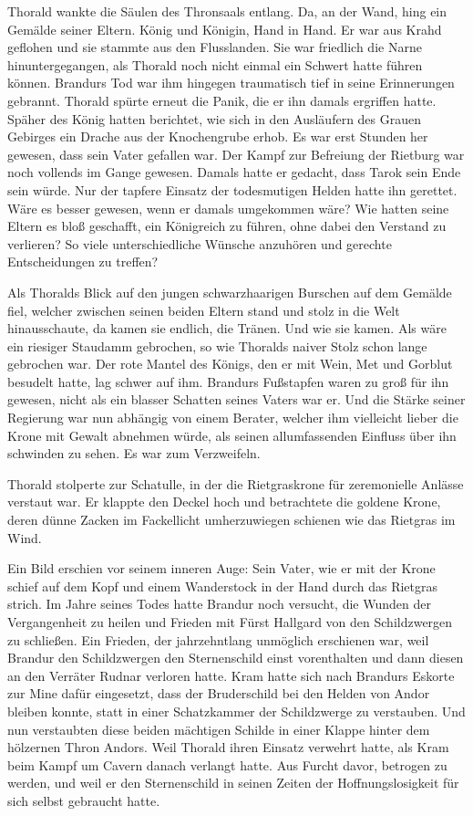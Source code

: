 Thorald wankte die Säulen des Thronsaals entlang. Da, an der Wand, hing ein Gemälde seiner Eltern. König und Königin, Hand in Hand. Er war aus Krahd geflohen und sie stammte aus den Flusslanden. Sie war friedlich die Narne hinuntergegangen, als Thorald noch nicht einmal ein Schwert hatte führen können. Brandurs Tod war ihm hingegen traumatisch tief in seine Erinnerungen gebrannt. Thorald spürte erneut die Panik, die er ihn damals ergriffen hatte. Späher des König hatten berichtet, wie sich in den Ausläufern des Grauen Gebirges ein Drache aus der Knochengrube erhob. Es war erst Stunden her gewesen, dass sein Vater gefallen war. Der Kampf zur Befreiung der Rietburg war noch vollends im Gange gewesen. Damals hatte er gedacht, dass Tarok sein Ende sein würde. Nur der tapfere Einsatz der todesmutigen Helden hatte ihn gerettet. Wäre es besser gewesen, wenn er damals umgekommen wäre? Wie hatten seine Eltern es bloß geschafft, ein Königreich zu führen, ohne dabei den Verstand zu verlieren? So viele unterschiedliche Wünsche anzuhören und gerechte Entscheidungen zu treffen?

Als Thoralds Blick auf den jungen schwarzhaarigen Burschen auf dem Gemälde fiel, welcher zwischen seinen beiden Eltern stand und stolz in die Welt hinausschaute, da kamen sie endlich, die Tränen. Und wie sie kamen. Als wäre ein riesiger Staudamm gebrochen, so wie Thoralds naiver Stolz schon lange gebrochen war. Der rote Mantel des Königs, den er mit Wein, Met und Gorblut besudelt hatte, lag schwer auf ihm. Brandurs Fußstapfen waren zu groß für ihn gewesen, nicht als ein blasser Schatten seines Vaters war er. Und die Stärke seiner Regierung war nun abhängig von einem Berater, welcher ihm vielleicht lieber die Krone mit Gewalt abnehmen würde, als seinen allumfassenden Einfluss über ihn schwinden zu sehen. Es war zum Verzweifeln.

Thorald stolperte zur Schatulle, in der die Rietgraskrone für zeremonielle Anlässe verstaut war. Er klappte den Deckel hoch und betrachtete die goldene Krone, deren dünne Zacken im Fackellicht umherzuwiegen schienen wie das Rietgras im Wind.

Ein Bild erschien vor seinem inneren Auge: Sein Vater, wie er mit der Krone schief auf dem Kopf und einem Wanderstock in der Hand durch das Rietgras strich. Im Jahre seines Todes hatte Brandur noch versucht, die Wunden der Vergangenheit zu heilen und Frieden mit Fürst Hallgard von den Schildzwergen zu schließen. Ein Frieden, der jahrzehntlang unmöglich erschienen war, weil Brandur den Schildzwergen den Sternenschild einst vorenthalten und dann diesen an den Verräter Rudnar verloren hatte. Kram hatte sich nach Brandurs Eskorte zur Mine dafür eingesetzt, dass der Bruderschild bei den Helden von Andor bleiben konnte, statt in einer Schatzkammer der Schildzwerge zu verstauben. Und nun verstaubten diese beiden mächtigen Schilde in einer Klappe hinter dem hölzernen Thron Andors. Weil Thorald ihren Einsatz verwehrt hatte, als Kram beim Kampf um Cavern danach verlangt hatte. Aus Furcht davor, betrogen zu werden, und weil er den Sternenschild in seinen Zeiten der Hoffnungslosigkeit für sich selbst gebraucht hatte.

